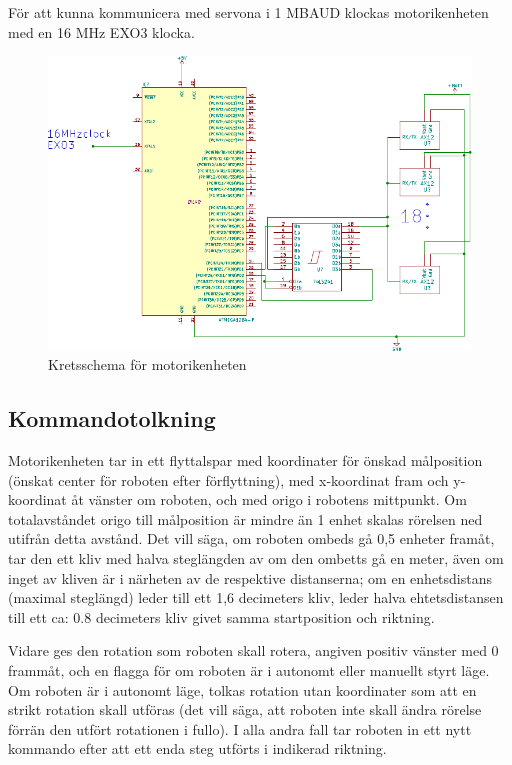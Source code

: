 \documentclass[a4paper,titlepage,12pt]{article}
\begin{document}
	För att kunna kommunicera med servona i 1 MBAUD klockas motorikenheten med en 16 MHz 
	EXO3 klocka.

	\begin{figure}[htpb]
		\centering
		\includegraphics[width=1.0\linewidth]{charts/motor/motorik.pdf}
		\caption{Kretsschema för motorikenheten}
		\label{fig:motorik}
	\end{figure}
	
		\subsection{Kommandotolkning}
	Motorikenheten  tar in ett flyttalspar med koordinater för önskad målposition (önskat 
	center för roboten efter förflyttning), med x-koordinat fram och 
	y-koordinat åt vänster om roboten, och med origo i robotens mittpunkt. Om totalavståndet 
	origo till målposition är mindre än 1 enhet skalas rörelsen ned utifrån detta avstånd. 
	Det vill säga, om roboten ombeds gå 0,5 enheter framåt, tar den ett kliv med halva 
	steglängden av om den ombetts gå en meter, även om inget av kliven är i närheten av 
	de respektive distanserna; om en enhetsdistans (maximal steglängd) leder till ett 
	1,6 decimeters kliv, leder halva ehtetsdistansen till ett ca: 0.8 decimeters kliv givet samma 
	startposition och riktning.
	
	Vidare ges den rotation som roboten 
	skall rotera, angiven positiv vänster med 0 frammåt, och en flagga för om 
	roboten är i autonomt eller manuellt styrt läge. Om roboten är i autonomt läge, tolkas 
	rotation utan koordinater som att en strikt rotation skall utföras (det vill säga, att 
	roboten inte skall ändra rörelse förrän den utfört rotationen i fullo). I alla andra fall 
	tar roboten in ett nytt kommando efter att ett enda steg utförts i indikerad riktning. 
	
\end{document}
